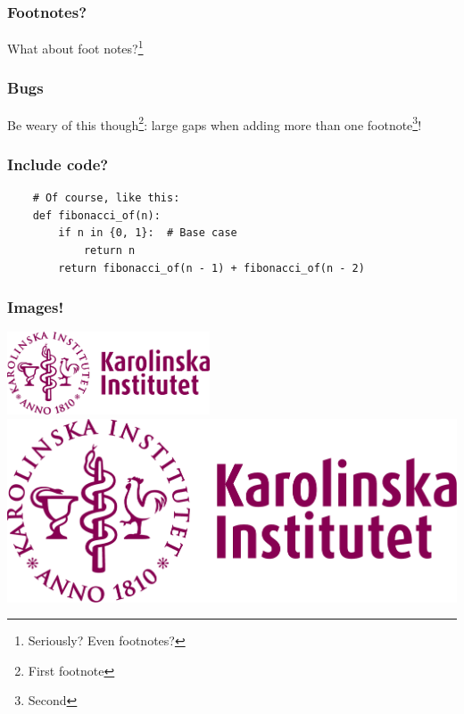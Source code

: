 \documentclass{beamer}
\begin{document}
\begin{frame}
    \frametitle{Footnotes?}
    What about foot notes?\footnote{Seriously? Even footnotes?}
\end{frame}

\begin{frame}
    \frametitle{Bugs}
    Be weary of this though\footnote{First footnote}: large gaps when adding more than one footnote\footnote{Second}!
\end{frame}


\begin{frame}[fragile]
    \frametitle{Include code?}
    {
        \small
        \begin{verbatim}
    # Of course, like this:
    def fibonacci_of(n):
        if n in {0, 1}:  # Base case
            return n
        return fibonacci_of(n - 1) + fibonacci_of(n - 2) 
    \end{verbatim}
    }
\end{frame}

\begin{frame}
    \frametitle{Images!}
    \centering
    \includegraphics[width=0.45\textwidth]{ki-logo-plum.pdf}%
    \hspace*{1cm}
    \includegraphics[width=0.45  \textwidth]{ki-logo-plum.pdf}
\end{frame}


\end{document}
